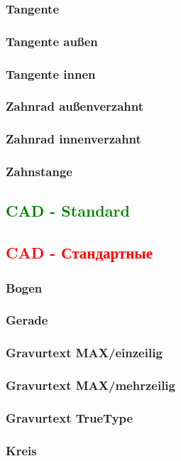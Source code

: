 \documentclass[14pt,a4paper]{book}
\newcommand{\DE}[1]{\textcolor{green}{#1}}
\newcommand{\RU}[1]{\textcolor{red}{#1}}
\begin{document}
			\subsubsection{Tangente}
			\subsubsection{Tangente außen}
			\subsubsection{Tangente innen}
			\subsubsection{Zahnrad außenverzahnt}
			\subsubsection{Zahnrad innenverzahnt}
			\subsubsection{Zahnstange}
		\DE{\subsection{CAD - Standard}}
		\RU{\subsection{CAD - Стандартные}}
			\subsubsection{Bogen} 
			\subsubsection{Gerade}
			\subsubsection{Gravurtext MAX/einzeilig} 
			\subsubsection{Gravurtext MAX/mehrzeilig}
			\subsubsection{Gravurtext TrueType} 
			\subsubsection{Kreis} 
\end{document}

